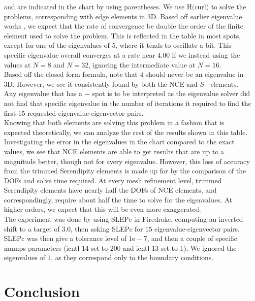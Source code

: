 \documentclass[manuscript,screen]{acmart}
\begin{document}
\noindent and are indicated in the chart by using parentheses.  We use H$($curl$)$ to solve the problems, corresponding with edge elements in 3D.  Based off earlier eigenvalue works \cite{boffi2010finite}, we expect that the rate of convergence be double the order of the finite element used to solve the problem.  This is reflected in the table in most spots, except for one of the eigenvalues of $5$, where it tends to oscillate a bit.  This specific eigenvalue overall converges at a rate near $4.00$ if we instead using the values at $N=8$ and $N=32$, ignoring the intermediate value at $N=16$.  \\

\noindent Based off the closed form formula, note that $4$ should never be an eigenvalue in 3D. However, we see it consistently found by both the NCE and $S^-$ elements.  Any eigenvalue that has a $-$ spot is to be interpreted as the eigenvalue solver did not find that specific eigenvalue in the number of iterations it required to find the first 15 requested eigenvalue-eigenvector pairs.\\

\noindent Knowing that both elements are solving this problem in a fashion that is expected theoretically, we can analyze the rest of the results shown in this table.  Investigating the error in the eigenvalues in the chart compared to the exact values, we see that NCE elements are able to get results that are up to a magnitude better, though not for every eigenvalue.  However, this loss of accuracy from the trimmed Serendipity elements is made up for by the comparison of the DOFs and solve time required.  At every mesh refinement level, trimmed Serendipity elements have nearly half the DOFs of NCE elements, and correspondingly, require about half the time to solve for the eigenvalues.  At higher orders, we expect that this will be even more exaggerated.  \\

\noindent The experiment was done by using SLEPc in Firedrake, computing an inverted shift to a target of $3.0$, then asking SLEPc for $15$ eigenvalue-eigenvector pairs.  SLEPc was then give a tolerance level of $1\text{e}-7$, and then a couple of specific mumps parameters (icntl 14 set to 200 and icntl 13 set to 1).  We ignored the eigenvalues of $1$, as they correspond only to the boundary conditions. 

\section{Conclusion}
\end{document}

